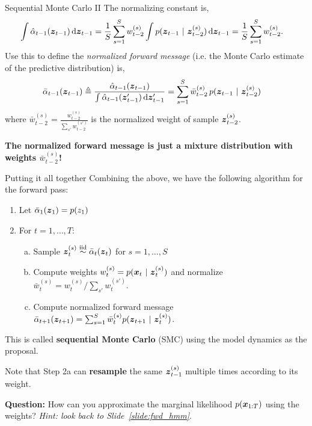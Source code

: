 \documentclass[aspectratio=169]{beamer}
\begin{document}
\begin{frame}{Sequential Monte Carlo II}
The normalizing constant is,
\begin{align}
   \int \hat{\alpha}_{t-1}(\boldsymbol{z}_{t-1}) \mathop{}\!\mathrm{d} \boldsymbol{z}_{t-1} &= 
   \frac{1}{S} \sum_{s=1}^S w_{t-2}^{(s)} \int p(\boldsymbol{z}_{t-1} ~\vert~ \boldsymbol{z}_{t-2}^{(s)}) \mathop{}\!\mathrm{d} \boldsymbol{z}_{t-1} 
   = \frac{1}{S} \sum_{s=1}^S w_{t-2}^{(s)}.
\end{align}
Use this to define the \textit{normalized forward message} (i.e. the Monte Carlo estimate of the predictive distribution) is,
\begin{align}
    \bar{\alpha}_{t-1}(\boldsymbol{z}_{t-1}) &\triangleq \frac{\hat{\alpha}_{t-1}(\boldsymbol{z}_{t-1})}{\int \hat{\alpha}_{t-1}(\boldsymbol{z}_{t-1}') \mathop{}\!\mathrm{d} \boldsymbol{z}_{t-1}'}
    = \sum_{s=1}^S \bar{w}_{t-2}^{(s)} \, p(\boldsymbol{z}_{t-1} ~\vert~ \boldsymbol{z}_{t-2}^{(s)})
\end{align}
where $\bar{w}_{t-2}^{(s)} = \frac{w_{t-2}^{(s)}}{\sum_{s'} w_{t-2}^{(s')}}$ is the normalized weight of sample $\boldsymbol{z}_{t-2}^{(s)}$.

\textbf{The normalized forward message is just a mixture distribution with weights $\bar{w}_{t-2}^{(s)}$!}
\end{frame}

\begin{frame}{Putting it all together}
Combining the above, we have the following algorithm for the forward pass:
\begin{enumerate}
    \item Let $\bar{\alpha}_1(\boldsymbol{z}_1) = p(z_1)$
    \item For $t=1, \ldots, T$:
    \begin{enumerate}[a.]
        \item Sample $\boldsymbol{z}_{t}^{(s)} \stackrel{\text{iid}}{\sim} \bar{\alpha}_t(\boldsymbol{z}_t)$ for $s=1, \ldots, S$
        \item Compute weights $w_t^{(s)} = p(\boldsymbol{x}_t ~\vert~ \boldsymbol{z}_t^{(s)})$ and normalize $\bar{w}_t^{(s)} = w_t^{(s)} / \sum_{s'} w_t^{(s')}$.
        \item Compute normalized forward message $\bar{\alpha}_{t+1}(\boldsymbol{z}_{t+1}) = \sum_{s=1}^S \bar{w}_t^{(s)} p(\boldsymbol{z}_{t+1} ~\vert~ \boldsymbol{z}_t^{(s)})$.
    \end{enumerate}
\end{enumerate}

This is called \textbf{sequential Monte Carlo} (SMC) using the model dynamics as the proposal.

Note that Step 2a can \textbf{resample} the same $\boldsymbol{z}_{t-1}^{(s)}$ multiple times according to its weight. 

\textbf{Question:} How can you approximate the marginal likelihood $p(\boldsymbol{x}_{1:T})$ using the weights? \textit{Hint: look back to Slide~\ref{slide:fwd_hmm}}.

\end{frame}
\end{document}
